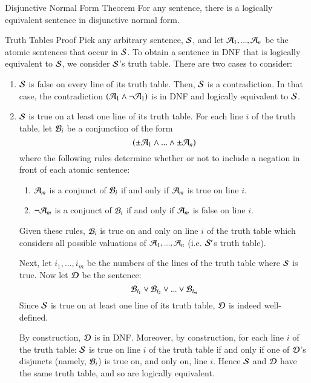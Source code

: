 \documentclass[12pt, a4paper, twoside, openright, titlepage]{book}
\begin{document}
\begin{namthm}{Disjunctive Normal Form Theorem}{}
    For any sentence, there is a logically equivalent sentence in disjunctive normal form.
\end{namthm}
\begin{proof*}{Truth Tables Proof}{}
    Pick any arbitrary sentence, $\mathcal{S}$, and let $\mathcal{A}_1,...,\mathcal{A}_n$ be the atomic sentences that occur in $\mathcal{S}$. To obtain a sentence in DNF that is logically equivalent to $\mathcal{S}$, we consider $\mathcal{S}$'s truth table. There are two cases to consider: \begin{enumerate}
        \item $\mathcal{S}$ is false on every line of its truth table. Then, $\mathcal{S}$ is a contradiction. In that case, the contradiction $(\mathcal{A}_1\wedge\neg\mathcal{A}_1)$ is in DNF and logically equivalent to $\mathcal{S}$.
        \item $\mathcal{S}$ is true on at least one line of its truth table. For each line $i$ of the truth table, let $\mathcal{B}_i$ be a conjunction of the form \begin{equation*}
                (\pm\mathcal{A}_1\wedge...\wedge\pm\mathcal{A}_n)
        \end{equation*}
            where the following rules determine whether or not to include a negation in front of each atomic sentence: \begin{enumerate}
                \item $\mathcal{A}_m$ is a conjunct of $\mathcal{B}_i$ if and only if $\mathcal{A}_m$ is true on line $i$.
                \item $\neg \mathcal{A}_m$ is a conjunct of $\mathcal{B}_i$ if and only if $\mathcal{A}_m$ is false on line $i$.
            \end{enumerate}
            Given these rules, $\mathcal{B}_i$ is true on and only on line $i$ of the truth table which considers all possible valuations of $\mathcal{A}_1,...,\mathcal{A}_n$ (i.e. $\mathcal{S}'$s truth table).

            Next, let $i_1,...,i_m$ be the numbers of the lines of the truth table where $\mathcal{S}$ is true. Now let $\mathcal{D}$ be the sentence: \begin{equation*}
                \mathcal{B}_{i_1}\vee\mathcal{B}_{i_2}\vee ...\vee \mathcal{B}_{i_m}
            \end{equation*}
            Since $\mathcal{S}$ is true on at least one line of its truth table, $\mathcal{D}$ is indeed well-defined. 


            By construction, $\mathcal{D}$ is in DNF. Moreover, by construction, for each line $i$ of the truth table: $\mathcal{S}$ is true on line $i$ of the truth table if and only if one of $\mathcal{D}$'s disjuncts (namely, $\mathcal{B}_i$) is true on, and only on, line $i$. Hence $\mathcal{S}$ and $\mathcal{D}$ have the same truth table, and so are logically equivalent.
    \end{enumerate}
\end{proof*}
\end{document}

